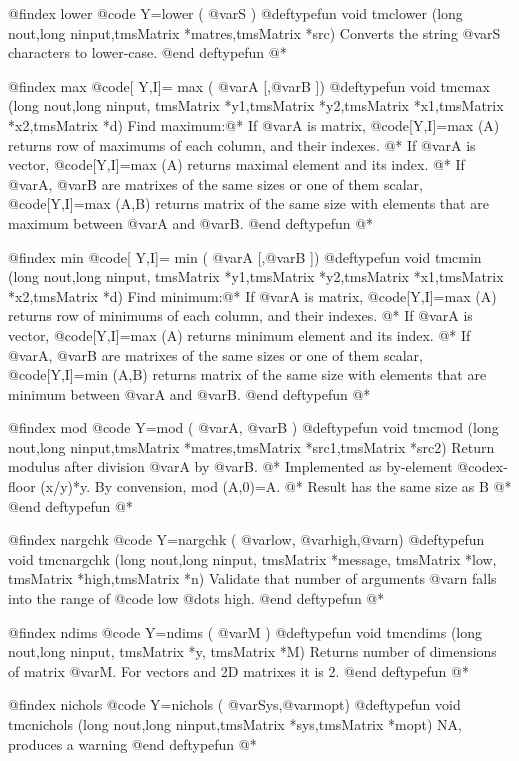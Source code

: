 @findex  lower
@code{ Y=lower  ( @var{S} ) }
@deftypefun void tmclower  (long nout,long ninput,tmsMatrix *matres,tmsMatrix *src)
Converts the string @var{S} characters to lower-case.
@end deftypefun
@*


@findex max
@code{[ Y,I]= max  ( @var{A} [,@var{B} ]) }
@deftypefun void tmcmax  (long nout,long ninput, tmsMatrix *y1,tmsMatrix *y2,tmsMatrix *x1,tmsMatrix *x2,tmsMatrix *d)
Find maximum:@*
If  @var{A} is matrix, @code{[Y,I]=max (A)} returns row of maximums of each column, and their indexes. @*
If  @var{A} is vector, @code{[Y,I]=max (A)} returns  maximal element and its index. @*
If  @var{A}, @var{B } are matrixes of the same sizes or one of them scalar, @code{[Y,I]=max (A,B)} returns matrix of the same size 
with elements that are maximum between @var{A} and @var{B}.
@end deftypefun
@*

 @findex min
@code{[ Y,I]= min  ( @var{A} [,@var{B} ]) }
@deftypefun void tmcmin  (long nout,long ninput, tmsMatrix *y1,tmsMatrix *y2,tmsMatrix *x1,tmsMatrix *x2,tmsMatrix *d)
Find minimum:@*
If  @var{A} is matrix, @code{[Y,I]=max (A)} returns row of minimums of each column, and their indexes. @*
If  @var{A} is vector, @code{[Y,I]=max (A)} returns  minimum element and its index. @*
If  @var{A}, @var{B } are matrixes of the same sizes or one of them scalar, @code{[Y,I]=min (A,B)} returns matrix of the same size 
with elements that are minimum between @var{A} and @var{B}.
@end deftypefun
@*

 
@findex  mod
@code{ Y=mod  ( @var{A}, @var{B} ) }
@deftypefun void tmcmod  (long nout,long ninput,tmsMatrix *matres,tmsMatrix *src1,tmsMatrix *src2)
Return modulus after division @var{A} by @var{B}. @*
Implemented as by-element @code{x-floor (x/y)*y}.  By convension, mod (A,0)=A. @*
Result has the same size as B @*
@end deftypefun
@*



@findex  nargchk
@code{ Y=nargchk  ( @var{low}, @var{high},@var{n}) }
@deftypefun void tmcnargchk  (long nout,long ninput, tmsMatrix *message, tmsMatrix *low, tmsMatrix *high,tmsMatrix *n)
Validate that number of arguments @var{n} falls into the range of @code{ low  @dots{} high}.
@end deftypefun
@*


@findex  ndims
@code{ Y=ndims  ( @var{M} ) }
@deftypefun void tmcndims  (long nout,long ninput, tmsMatrix *y, tmsMatrix *M)
Returns number of dimensions of matrix @var{M}. For vectors and 2D matrixes it is 2.
@end deftypefun
@*


@findex  nichols
@code{ Y=nichols  (  @var{Sys},@var{mopt})}
@deftypefun void tmcnichols  (long nout,long ninput,tmsMatrix *sys,tmsMatrix *mopt)
NA, produces a warning
@end deftypefun
@*



